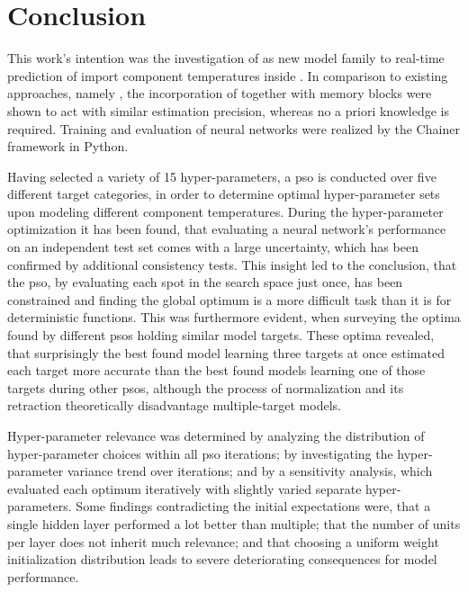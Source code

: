 \chapter{Conclusion} 
\label{cha:conclusion}

This work's intention was the investigation of  as new model family to real-time prediction of import component temperatures inside .
In comparison to existing approaches, namely , the incorporation of  together with memory blocks were shown to act with similar estimation precision, whereas no a priori knowledge is required. 
Training and evaluation of neural networks were realized by the Chainer framework in Python.

Having selected a variety of 15 hyper-parameters, a \acrlong{pso} is conducted over five different target categories, in order to determine optimal hyper-parameter sets upon modeling different component temperatures.
During the hyper-parameter optimization it has been found, that evaluating a neural network's performance on an independent test set comes with a large uncertainty, which has been confirmed by additional consistency tests.
This insight led to the conclusion, that the \gls{pso}, by evaluating each spot in the search space just once, has been constrained and finding the global optimum is a more difficult task than it is for deterministic functions.
This was furthermore evident, when surveying the optima found by different \glspl{pso} holding similar model targets.
These optima revealed, that surprisingly the best found model learning three targets at once estimated each target more accurate than the best found models learning one of those targets during other \glspl{pso}, although the process of normalization and its retraction theoretically disadvantage multiple-target models.

Hyper-parameter relevance was determined by analyzing the distribution of hyper-parameter choices within all \gls{pso} iterations; by investigating the hyper-parameter variance trend over iterations; and by a sensitivity analysis, which evaluated each optimum iteratively with slightly varied separate hyper-parameters.
Some findings contradicting the initial expectations were, that a single hidden layer performed a lot better than multiple; that the number of units per layer does not inherit much relevance; and that choosing a uniform weight initialization distribution leads to severe deteriorating consequences for model performance.

